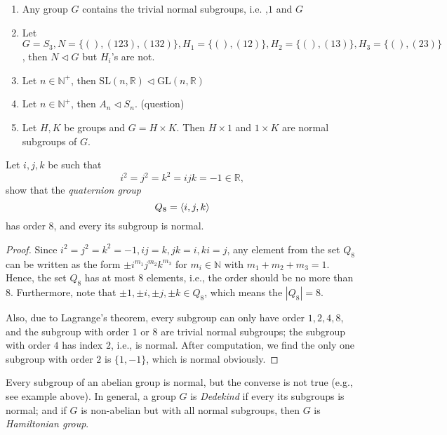 \begin{example}
\begin{enumerate}
\item
Any group $G$ contains the trivial normal subgroups, i.e. ,$1$ and $G$
\item
Let $G=S_3, N=\{(),(123),(132)\}, H_1=\{(),(12)\},H_2=\{(),(13)\},H_3=\{(),(23)\}$, then $N\triangleleft G$ but $H_i$'s are not.
\item
Let $n\in\mathbb{N}^+$, then $\mbox{SL}(n,\mathbb{R})\triangleleft\mbox{GL}(n,\mathbb{R})$
\item
Let $n\in\mathbb{N}^+$, then $A_n\triangleleft S_n$. (question)
\item
Let $H,K$ be groups and $G=H\times K$. Then $H\times 1$ and $1\times K$ are normal subgroups of $G$.
\end{enumerate}
\end{example}
\begin{proposition}
Let $i,j,k$ be such that
\[
i^2=j^2=k^2=ijk=-1\in\mathbb{R},
\]
show that the \emph{quaternion group}
\[
Q_8=\langle i,j,k\rangle
\]
has order $8$, and every its subgroup is normal.
\end{proposition}
\begin{proof}
Since $i^2=j^2=k^2=-1,ij=k,jk=i,ki=j$, any element from the set $Q_8$ can be written as the form $\pm i^{m_1}j^{m_2}k^{m_3}$ for $m_i\in\mathbb{N}$ with $m_1+m_2+m_3=1$. Hence, the set $Q_8$ has at most $8$ elements, i.e., the order should be no more than $8$. Furthermore, note that $\pm1,\pm i,\pm j,\pm k\in Q_8$, which means the $|Q_8|=8$.

Also, due to Lagrange's theorem, every subgroup can only have order $1,2,4,8$, and the subgroup with order $1$ or $8$ are trivial normal subgroups; the subgroup with order $4$ has index $2$, i.e., is normal. After computation, we find the only one subgroup with order $2$ is $\{1,-1\}$, which is normal obviously.
\end{proof}
\begin{remark}
Every subgroup of an abelian group is normal, but the converse is not true (e.g., see example above). In general, a group $G$ is \emph{Dedekind} if every its subgroups is normal; and if $G$ is non-abelian but with all normal subgroups, then $G$ is \emph{Hamiltonian group}.
\end{remark}

